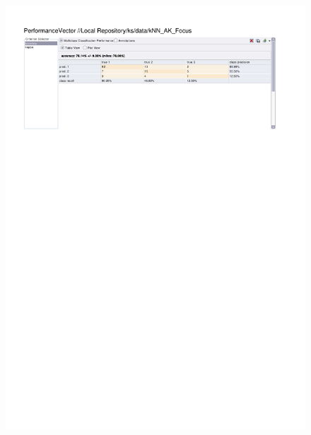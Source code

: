 \begin{figure}[htp]
  \centerline{\includegraphics[trim=0 680 0 60,clip,width=16.09cm]{results/kNN_A_Focus.pdf}} \caption{
} \label{kNN_K_Focus}
\end{figure}

